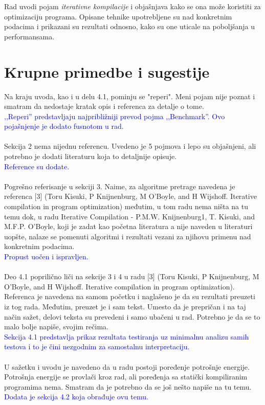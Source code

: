 \documentclass[a4paper]{report}
\newcommand{\odgovor}[1]{\textcolor{blue}{#1}}
\begin{document}
Rad uvodi pojam \textit{iterativne kompilacije} i objašnjava kako se ona može koristiti za optimizaciju programa. Opisane tehnike upotrebljene su nad konkretnim podacima i prikazani su rezultati odnosno, kako su one uticale na poboljšanja u performansama. 

\section{Krupne primedbe i sugestije}

\label{sec: primedbe}

\noindent Na kraju uvoda, kao i u delu 4.1, pominju se "reperi". Meni pojam nije poznat i smatram da nedostaje kratak opis i referenca za detalje o tome.
\\
\odgovor{,,Reperi'' predstavljaju najpribližniji prevod pojma ,,Benchmark''. Ovo pojašnjenje je dodato fusnotom u rad. }
\\
\\
Sekcija 2 nema nijednu referencu. Uvedeno je 5 pojmova i lepo su objašnjeni, ali potrebno je dodati literaturu koja to detaljnije opisuje.
\\
\odgovor{Reference su dodate. }
\\
\\
Pogrešno referisanje u sekciji 3. Naime, za algoritme pretrage navedena je referenca [3] (Toru Kisuki, P Knijnenburg, M O'Boyle, and H Wijshoff. Iterative compilation in program optimization) međutim, u tom radu nema ništa na tu temu dok, u radu Iterative Compilation - P.M.W. Knijnenburg1, T. Kisuki, and M.F.P. O'Boyle, koji je zadat kao početna literatura a nije naveden u literaturi uopšte, nalaze se pomenuti algoritmi i rezultati vezani za njihovu primenu nad konkretnim podacima.
\\
\odgovor{Propust uočen i ispravljen.}
\\
\\
Deo 4.1 poprilično liči na sekcije 3 i 4 u radu  [3] (Toru Kisuki, P Knijnenburg, M O'Boyle, and H Wijshoff. Iterative compilation in program optimization). Referenca je navedena na samom početku i naglašeno je da su rezultati preuzeti iz tog rada. Međutim, preuzet je i sam tekst. Umesto da je prepričan i na taj način sažet, delovi teksta su prevedeni i samo ubačeni u rad. Potrebno je da se to malo bolje napiše, svojim rečima.
\\
\odgovor{Sekcija 4.1 predstavlja prikaz rezultata testiranja uz minimalnu analizu samih testova i to je čini nezgodnim za samostalnu
		 interpretaciju.}
\\
\\
U sažetku i uvodu je navedeno da u radu postoji poređenje potrošnje energije. Potrošnja energije se provlači kroz rad, ali poređenja sa statički kompiliranim programima nema. Smatram da je potrebno da se još nešto napiše na tu temu.
\\
\odgovor{Dodata je sekcija 4.2 koja obrađuje ovu temu.}
\end{document}
